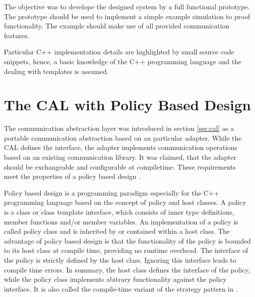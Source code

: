The objective was to develope the designed system by a full functional prototype.
The prototype should be used to implement a simple example simulation
to proof functionality. The example should make use of all provided
communication features.

Particular C++ implementation details are highlighted by small source
code snippets, hence, a basic knowledge of the C++ programming
language and the dealing with templates is assumed.

\section{The CAL with Policy Based Design}

The communication abstraction layer was introduced in section
\ref{sec:cal} as a portable communication abstraction based on an
particular adapter. While the CAL defines the interface, the adapter
implements communication operations based on an existing communication
library.  It was claimed, that the adapter should be exchangeable and
configurable at compiletime. These requirements meet the properties of
a policy based design \cite{ref:policy_based_design}.

Policy based design is a programming paradigm especially for the C++
programming language based on the concept of policy and host classes.
A policy is a class or class template interface, which consists of
inner type definitions, member functions and/or member variables. An
implementation of a policy is called policy class and is inherited by
or contained within a host class.  The advantage of policy based
design is that the functionality of the policy is bounded to its host
class at compile time, providing no runtime overhead.  The interface
of the policy is strictly defined by the host class. Ignoring this
interface leads to compile time errors. In summary, the host class
defines the interface of the policy, while the policy class implements
abitrary functionality against the policy interface. It is also called
the compile-time variant of the strategy pattern in
\cite{ref:policy_strategy}.

